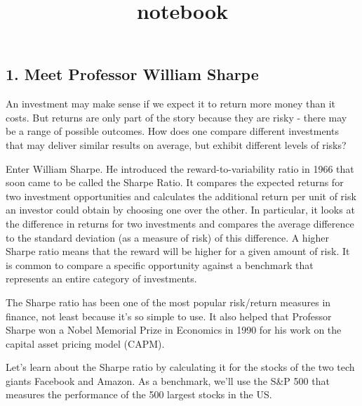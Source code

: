 \documentclass[11pt]{article}
\title{notebook}
\begin{document}
    
    
    \maketitle
    
    

    
    \subsection{1. Meet Professor William
Sharpe}\label{meet-professor-william-sharpe}

An investment may make sense if we expect it to return more money than
it costs. But returns are only part of the story because they are risky
- there may be a range of possible outcomes. How does one compare
different investments that may deliver similar results on average, but
exhibit different levels of risks?

Enter William Sharpe. He introduced the reward-to-variability ratio in
1966 that soon came to be called the Sharpe Ratio. It compares the
expected returns for two investment opportunities and calculates the
additional return per unit of risk an investor could obtain by choosing
one over the other. In particular, it looks at the difference in returns
for two investments and compares the average difference to the standard
deviation (as a measure of risk) of this difference. A higher Sharpe
ratio means that the reward will be higher for a given amount of risk.
It is common to compare a specific opportunity against a benchmark that
represents an entire category of investments.

The Sharpe ratio has been one of the most popular risk/return measures
in finance, not least because it's so simple to use. It also helped that
Professor Sharpe won a Nobel Memorial Prize in Economics in 1990 for his
work on the capital asset pricing model (CAPM).

Let's learn about the Sharpe ratio by calculating it for the stocks of
the two tech giants Facebook and Amazon. As a benchmark, we'll use the
S\&P 500 that measures the performance of the 500 largest stocks in the
US.
\end{document}

